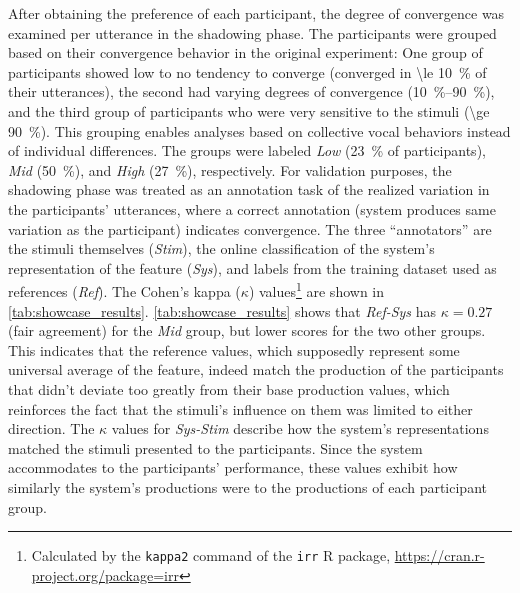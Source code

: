 %
After obtaining the preference of each participant, the degree of convergence was examined per utterance in the shadowing phase.
The participants were grouped based on their convergence behavior in the original experiment:
One group of participants showed low to no tendency to converge (converged in \SI{\le 10}{\percent} of their utterances),
the second had varying degrees of convergence (\SIrange{10}{90}{\percent}),
and the third group of participants who were very sensitive to the stimuli (\SI{\ge 90}{\percent}).
This grouping enables analyses based on collective vocal behaviors instead of individual differences.
The groups were labeled \emph{Low} (\SI{23}{\percent} of participants), \emph{Mid} (\SI{50}{\percent}), and \emph{High} (\SI{27}{\percent}), respectively.
For validation purposes, the shadowing phase was treated as an annotation task of the realized variation in the participants' utterances, where a correct annotation (system produces same variation as the participant) indicates convergence.
The three \enquote{annotators} are the stimuli themselves (\emph{Stim}), the online classification of the system's representation of the feature (\emph{Sys}), and labels from the training dataset used as references (\emph{Ref}).
The Cohen's kappa ($\kappa$) values\footnote{Calculated by the \texttt{kappa2} command of the \texttt{irr} R package, \url{https://cran.r-project.org/package=irr}} are shown in \cref{tab:showcase_results}.
\cref{tab:showcase_results} shows that \emph{Ref-Sys} has $\kappa = 0.27$ (fair agreement) for the \emph{Mid} group, but lower scores for the two other groups.
This indicates that the reference values, which supposedly represent some universal average of the feature, indeed match the production of the participants that didn't deviate too greatly from their base production values, which reinforces the fact that the stimuli's influence on them was limited to either direction.
The $\kappa$ values for \emph{Sys-Stim} describe how the system's representations matched the stimuli presented to the participants.
Since the system accommodates to the participants' performance, these values exhibit how similarly the system's productions were to the productions of each participant group.
